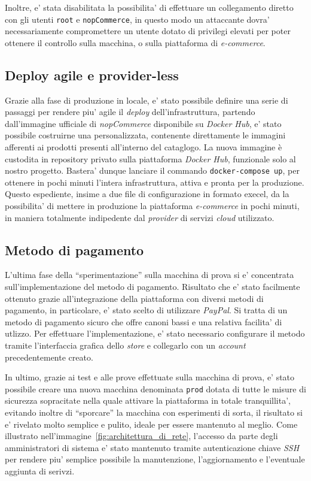 \documentclass[a4paper]{report}
\newcommand{\quotes}[1]{``#1''}
\begin{document}
			Inoltre, e' stata disabilitata la possibilita' di effettuare un collegamento diretto con gli utenti
			\texttt{root} e \texttt{nopCommerce}, in questo modo un attaccante dovra' necessariamente compromettere un
			utente dotato di privilegi elevati per poter ottenere il controllo sulla macchina, o sulla piattaforma di
			\emph{e-commerce}.

		\subsection{Deploy agile e provider-less}\label{deploy_agile_e_provider_less}
			Grazie alla fase di produzione in locale, e' stato possibile definire una serie di passaggi per rendere piu'
			agile il \emph{deploy} dell'infrastruttura, partendo dall'immagine ufficiale di \emph{nopCommerce}
			disponibile su \emph{Docker Hub}, e' stato possibile costruirne una personalizzata, contenente direttamente
			le immagini afferenti ai prodotti presenti all'interno del cataglogo.  La nuova immagine è custodita in
			repository privato sulla piattaforma \emph{Docker Hub}, funzionale solo al nostro progetto.  Bastera' dunque
			lanciare il commando \texttt{docker-compose up}, per ottenere in pochi minuti l'intera infrastruttura,
			attiva e pronta per la produzione.  Questo espediente, insime a due file di configurazione in formato
			execel, da la possibilita' di mettere in produzione la piattaforma \emph{ e-commerce} in pochi minuti, in
			maniera totalmente indipedente dal \emph{provider} di servizi \emph{cloud} utilizzato.

		\subsection{Metodo di pagamento}\label{metodo_di_pagamento}
			L'ultima fase della \quotes{sperimentazione} sulla macchina di prova si e' concentrata sull'implementazione
			del metodo di pagamento. Risultato che e' stato facilmente ottenuto grazie all'integrazione della
			piattaforma con diversi metodi di pagamento, in particolare, e' stato scelto di utilizzare \emph{PayPal}. Si
			tratta di un metodo di pagamento sicuro che offre canoni bassi e una relativa facilita' di utlizzo. Per
			effettuare l'implementazione, e' stato necessario configurare il metodo tramite l'interfaccia grafica dello
			\emph{store} e collegarlo con un \emph{account} precedentemente creato.

		In ultimo, grazie ai test e alle prove effettuate sulla macchina di prova, e' stato possibile creare una nuova
		macchina denominata \texttt{prod} dotata di tutte le misure di sicurezza sopracitate nella quale attivare la
		piattaforma in totale tranquillita', evitando inoltre di \quotes{sporcare} la macchina con esperimenti di sorta,
		il risultato si e' rivelato molto semplice e pulito, ideale per essere mantenuto al meglio. Come illustrato
		nell'immagine~\ref{fig:architettura_di_rete}, l'accesso da parte degli amministratori di sistema e' stato
		mantenuto tramite autenticazione chiave \emph{SSH} per rendere piu' semplice possibile la manutenzione,
		l'aggiornamento e l'eventuale aggiunta di serivzi.
\end{document}
